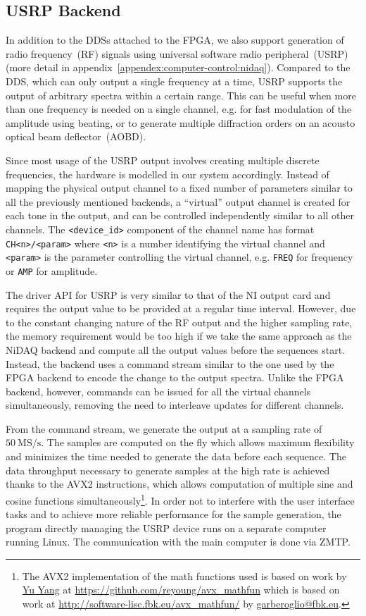 \subsection{USRP Backend}
\label{ch:computer-control:backend:usrp}

In addition to the DDSs attached to the FPGA, we also support generation of
radio frequency~(RF) signals using universal software radio peripheral~(USRP)
(more detail in appendix~\ref{appendex:computer-control:nidaq}).
Compared to the DDS, which can only output a single frequency at a time,
USRP supports the output of arbitrary spectra within a certain range.
This can be useful when more than one frequency is needed on a single channel,
e.g. for fast modulation of the amplitude using beating,
or to generate multiple diffraction orders on an acousto optical beam deflector~(AOBD).

Since most usage of the USRP output involves creating multiple discrete frequencies,
the hardware is modelled in our system accordingly.
Instead of mapping the physical output channel to a fixed number of parameters
similar to all the previously mentioned backends,
a ``virtual'' output channel is created for each tone in the output,
and can be controlled independently similar to all other channels.
The \verb`<device_id>` component of the channel name has format \verb`CH<n>/<param>`
where \verb`<n>` is a number identifying the virtual channel
and \verb`<param>` is the parameter controlling the virtual channel,
e.g. \verb`FREQ` for frequency or \verb`AMP` for amplitude.

The driver API for USRP is very similar to that of the NI output card
and requires the output value to be provided at a regular time interval.
However, due to the constant changing nature of the RF output and the higher sampling rate,
the memory requirement would be too high if we take the same approach as the NiDAQ backend
and compute all the output values before the sequences start.
Instead, the backend uses a command stream similar to the one used by the FPGA backend
to encode the change to the output spectra.
Unlike the FPGA backend, however, commands can be issued
for all the virtual channels simultaneously,
removing the need to interleave updates for different channels.

From the command stream, we generate the output at a sampling rate of $50~\mathrm{MS/s}$.
The samples are computed on the fly which allows maximum flexibility
and minimizes the time needed to generate the data before each sequence.
The data throughput necessary to generate samples at the high rate is achieved
thanks to the AVX2 instructions,
which allows computation of multiple sine and cosine functions simultaneously\footnote{
  The AVX2 implementation of the math functions used is based on work by
  \href{https://github.com/reyoung}{Yu Yang} at \url{https://github.com/reyoung/avx_mathfun}
  which is based on work at \url{http://software-lisc.fbk.eu/avx_mathfun/}
  by \href{mailto:garberoglio@fbk.eu}{garberoglio@fbk.eu}.
}. In order not to interfere with the user interface tasks
and to achieve more reliable performance for the sample generation,
the program directly managing the USRP device runs on a separate computer running Linux.
The communication with the main computer is done via ZMTP.

